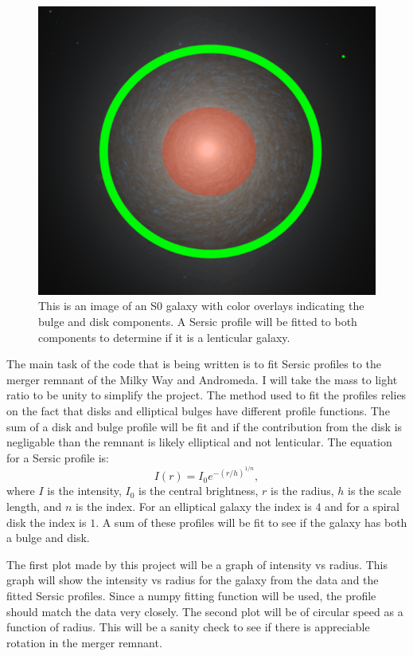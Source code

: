 \documentclass[fleqn,usenatbib]{mnras}
\begin{document}
 \begin{figure}
     \centering
     \includegraphics[scale=0.35]{Figures/NGC1387_-_hst_10217R850GB475.png}
     \caption{This is an image of an S0 galaxy with color overlays indicating the bulge and disk components. A Sersic profile will be fitted to both components to determine if it is a lenticular galaxy.}
     \label{fig_2}
 \end{figure}

 The main task of the code that is being written is to fit Sersic profiles to the merger remnant of the Milky Way and Andromeda. I will take the mass to light ratio to be unity to simplify the project. The method used to fit the profiles relies on the fact that disks and elliptical bulges have different profile functions. The sum of a disk and bulge profile will be fit and if the contribution from the disk is negligable than the remnant is likely elliptical and not lenticular. The equation for a Sersic profile is:
 \begin{equation}
     I(r) = I_0e^{-(r/h)^{1/n}},
 \end{equation}
 where $I$ is the intensity, $I_0$ is the central brightness, $r$ is the radius, $h$ is the scale length, and $n$ is the index. For an elliptical galaxy the index is $4$ and for a spiral disk the index is $1$. A sum of these profiles will be fit to see if the galaxy has both a bulge and disk.

 The first plot made by this project will be a graph of intensity vs radius. This graph will show the intensity vs radius for the galaxy from the data and the fitted Sersic profiles. Since a numpy fitting function will be used, the profile should match the data very closely. The second plot will be of circular speed as a function of radius. This will be a sanity check to see if there is appreciable rotation in the merger remnant.
\end{document}
